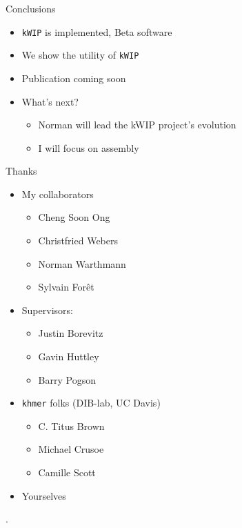 \documentclass[t]{beamer}
\begin{document}
\begin{frame}{Conclusions}
  \begin{itemize}
    \item \texttt{kWIP} is implemented, Beta software
    \item We show the utility of \texttt{kWIP}
    \item Publication coming soon
      \pause
    \item What's next?
      \begin{itemize}
        \item Norman will lead the kWIP project's evolution
        \item I will focus on assembly
      \end{itemize}
  \end{itemize}
\end{frame}

\begin{frame}{Thanks}
  \begin{itemize}
    \item My collaborators
      \begin{itemize}
        \item Cheng Soon Ong
        \item Christfried Webers
        \item Norman Warthmann
        \item Sylvain For\^{e}t
      \end{itemize}
    \item Supervisors:
      \begin{itemize}
        \item Justin Borevitz
        \item Gavin Huttley
        \item Barry Pogson
      \end{itemize}
    \item \texttt{khmer} folks (DIB-lab, UC Davis)
      \begin{itemize}
        \item C. Titus Brown
        \item Michael Crusoe
        \item Camille Scott
      \end{itemize}
    \item Yourselves
  \end{itemize}
\end{frame}

\begin{frame}[shrink=20]{}
  \printbibliography
  \vfill
  .
\end{frame}
\end{document}
